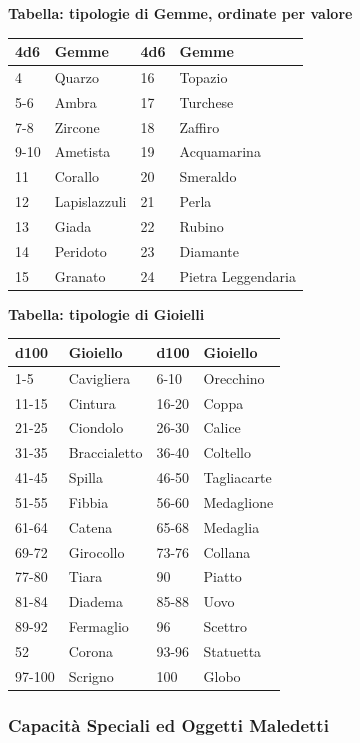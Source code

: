 \begin{multicols}{2}
{\medskip

\textbf{Tabella: tipologie di Gemme, ordinate per valore}

\noindent\begin{tabularx}{0.48\textwidth}{l|l|l|l}
	\toprule
		\textbf{4d6} & \textbf{Gemme} & \textbf{4d6} & \textbf{Gemme} \\
\toprule
		4 & Quarzo & 16 &  Topazio\\
		5-6 & Ambra & 17 & Turchese \\
		7-8 & Zircone & 18 & Zaffiro \\
		9-10 & Ametista & 19 &  Acquamarina\\
		11 & Corallo & 20 & Smeraldo \\
		12 & Lapislazzuli & 21 & Perla \\
		13 & Giada & 22 & Rubino\\
		14 & Peridoto & 23 &  Diamante\\
		15 & Granato & 24 & Pietra Leggendaria\\
\end{tabularx}

\textbf{Tabella: tipologie di Gioielli}

\medskip

{\small \begin{tabular}{l|l|l|l}
		\toprule
\textbf{d100} & \textbf{Gioiello} & \textbf{d100} & \textbf{Gioiello}\\
\toprule
1-5 & Cavigliera & 6-10 & Orecchino \\
11-15 & Cintura& 16-20 & Coppa\\
21-25 & Ciondolo& 26-30 & Calice\\
31-35 & Braccialetto& 36-40 & Coltello\\
41-45 & Spilla& 46-50 & Tagliacarte\\
51-55 & Fibbia& 56-60 & Medaglione\\
61-64 & Catena& 65-68 & Medaglia\\
69-72 & Girocollo& 73-76 & Collana\\
77-80 & Tiara& 90& Piatto\\
81-84 & Diadema& 85-88 & Uovo\\
89-92 & Fermaglio& 96 & Scettro\\
52    & Corona& 93-96 & Statuetta\\
97-100 & Scrigno& 100 & Globo
\end{tabular}}

\subsubsection{Capacità Speciali ed Oggetti Maledetti}

}
\end{multicols}
